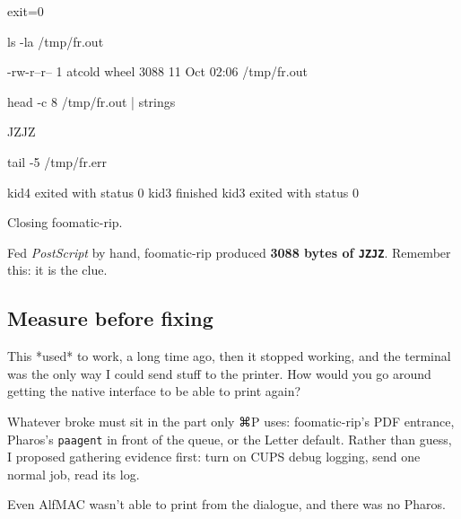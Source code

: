 \documentclass[11pt,a4paper]{article}
\begin{document}
\begin{cmdout}
exit=0
\end{cmdout}
\begin{mine}
ls -la /tmp/fr.out
\end{mine}
\begin{cmdout}
-rw-r--r--  1 atcold  wheel  3088 11 Oct 02:06 /tmp/fr.out
\end{cmdout}
\begin{mine}
head -c 8 /tmp/fr.out | strings
\end{mine}
\begin{cmdout}
JZJZ
\end{cmdout}
\begin{mine}
tail -5 /tmp/fr.err
\end{mine}
\begin{cmdout}
kid4 exited with status 0
kid3 finished
kid3 exited with status 0

Closing foomatic-rip.
\end{cmdout}

Fed \emph{PostScript} by hand, foomatic-rip produced \textbf{3088 bytes of \texttt{JZJZ}}. Remember this: it is the clue.

\subsection{Measure before fixing}

\begin{alf}
This *used* to work, a long time ago, then it stopped working, and the terminal was the only way I could send stuff to the printer. How would you go around getting the native interface to be able to print again?
\end{alf}

Whatever broke must sit in the part only ⌘P uses: foomatic-rip's PDF entrance, Pharos's \texttt{paagent} in front of the queue, or the Letter default. Rather than guess, I proposed gathering evidence first: turn on CUPS debug logging, send one normal job, read its log.

\begin{alf}
Even AlfMAC wasn't able to print from the dialogue, and there was no Pharos.
\end{alf}
\end{document}
